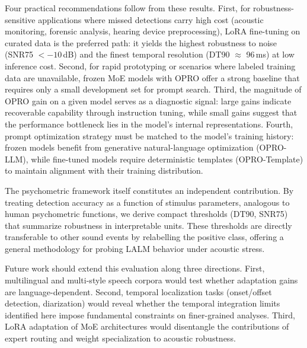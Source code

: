 \documentclass[11pt,a4paper]{article}
\begin{document}
Four practical recommendations follow from these results. First, for robustness-sensitive applications where missed detections carry high cost (acoustic monitoring, forensic analysis, hearing device preprocessing), LoRA fine-tuning on curated data is the preferred path: it yields the highest robustness to noise (SNR75 $< -10$\,dB) and the finest temporal resolution (DT90 $\approx$ 96\,ms) at low inference cost. Second, for rapid prototyping or scenarios where labeled training data are unavailable, frozen MoE models with OPRO offer a strong baseline that requires only a small development set for prompt search. Third, the magnitude of OPRO gain on a given model serves as a diagnostic signal: large gains indicate recoverable capability through instruction tuning, while small gains suggest that the performance bottleneck lies in the model's internal representations. Fourth, prompt optimization strategy must be matched to the model's training history: frozen models benefit from generative natural-language optimization (OPRO-LLM), while fine-tuned models require deterministic templates (OPRO-Template) to maintain alignment with their training distribution.

The psychometric framework itself constitutes an independent contribution. By treating detection accuracy as a function of stimulus parameters, analogous to human psychometric functions, we derive compact thresholds (DT90, SNR75) that summarize robustness in interpretable units. These thresholds are directly transferable to other sound events by relabelling the positive class, offering a general methodology for probing LALM behavior under acoustic stress.

Future work should extend this evaluation along three directions. First, multilingual and multi-style speech corpora would test whether adaptation gains are language-dependent. Second, temporal localization tasks (onset/offset detection, diarization) would reveal whether the temporal integration limits identified here impose fundamental constraints on finer-grained analyses. Third, LoRA adaptation of MoE architectures would disentangle the contributions of expert routing and weight specialization to acoustic robustness.



\end{document}
